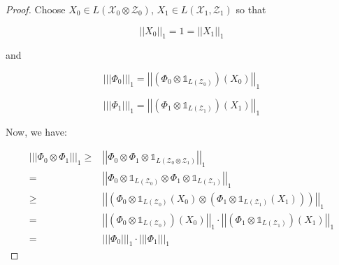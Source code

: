 \documentclass{article}
\begin{document}
\begin{proof}
    Choose $X_0 \in L(\mathcal{X}_0 \otimes \mathcal{Z}_0)$, $ X_1 \in
    L(\mathcal{X}_1,\mathcal{Z}_1) $ so that

    \[ 
        \left| \left| X_0 \right| \right|_1 = 1 = \left| \left| X_1 \right|
        \right|_1 
    \]
    
    and

    \[ 
        \left| \left| \left| \Phi_0 \right| \right| \right|_1 = \left| \left|
        \left( \Phi_0 \otimes \mathds{1}_{L(\mathcal{Z}_0)}\right) (X_0) 
\right| \right|_1
    \]
    
    
    \[ 
        \left| \left| \left| \Phi_1 \right| \right| \right|_1 = \left| \left|
        \left( \Phi_1 \otimes \mathds{1}_{L(\mathcal{Z}_1)}\right) (X_1) 
\right| \right|_1
    \]

    Now, we have:

    \begin{align*}
        \left| \left| \left| \Phi_0 \otimes \Phi_1 \right| \right| \right|_1
        \ge& \left| \left| \Phi_0 \otimes \Phi_1 \otimes
\mathds{1}_{L(\mathcal{Z}_0 \otimes \mathcal{Z}_1)} \right| \right|_1 \\
=& \left| \left| \Phi_0 \otimes \mathds{1}_{L(\mathcal{Z}_0)} \otimes \Phi_1
\otimes \mathds{1}_{L(\mathcal{Z}_1)} \right| \right|_1 \\
\ge& \left| \left| \left( \Phi_0 \otimes \mathds{1}_{L(\mathcal{Z}_0)} (X_0)
\otimes \left( \Phi_1 \otimes \mathds{1}_{L(\mathcal{Z}_1)}(X_1) \right)\right)
\right| \right|_1 \\
=& \left| \left| \left( \Phi_0 \otimes \mathds{1}_{L(\mathcal{Z}_0)} \right)
(X_0) \right| \right|_1 \cdot \left| \left| \left( \Phi_1 \otimes
\mathds{1}_{L(\mathcal{Z}_1)} \right) (X_1) \right| \right|_1 \\
=& \left| \left| \left| \Phi_0 \right| \right| \right|_1 \cdot \left| \left|
\left| \Phi_1 \right| \right| \right|_1
    \end{align*}
   

\end{proof}
\end{document}
